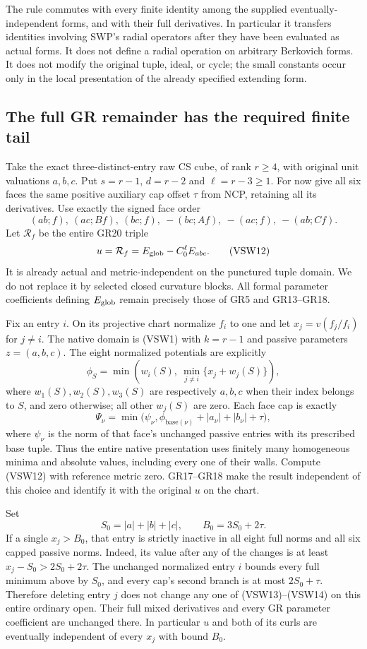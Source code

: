 The rule commutes with every finite identity among the supplied
eventually-independent forms, and with their full derivatives.
In particular it transfers identities involving SWP's radial
operators after they have been evaluated as actual forms.
It does not define a radial operation on arbitrary Berkovich
forms.  It does not modify the original tuple, ideal, or cycle;
the small constants occur only in the local presentation of the
already specified extending form.

\subsection{The full GR remainder has the required finite tail}

Take the exact three-distinct-entry raw CS cube, of rank $r\ge4$,
with original unit valuations $a,b,c$.  Put $s=r-1$,
$d=r-2$ and $\ell=r-3\ge1$.  For now give all six faces the
same positive auxiliary cap offset $\tau$ from NCP, retaining
all its derivatives.  Use exactly the signed face order
\[
 (ab;f),\ (ac;Bf),\ (bc;f),\ -(bc;Af),\ -(ac;f),\ -(ab;Cf).
 \tag{VSW11}
\]
Let $\mathcal R_f$ be the entire GR20 triple
\[
             u=\mathcal R_f=E_{\rm glob}-C_0^\ell E_{abc}.
 \tag{VSW12}
\]
It is already actual and metric-independent on the punctured
tuple domain.  We do not replace it by selected closed curvature
blocks.  All formal parameter coefficients defining $E_{\rm glob}$
remain precisely those of GR5 and GR13--GR18.

Fix an entry $i$.  On its projective chart normalize $f_i$ to
one and let $x_j=v(f_j/f_i)$ for $j\ne i$.  The native domain
is (VSW1) with $k=r-1$ and passive parameters $z=(a,b,c)$.
The eight normalized potentials are explicitly
\[
 \phi_S=\min\left(w_i(S),\ \min_{j\ne i}
                      \{x_j+w_j(S)\}\right),
 \tag{VSW13}
\]
where $w_1(S),w_2(S),w_3(S)$ are respectively $a,b,c$ when
their index belongs to $S$, and zero otherwise; all other
$w_j(S)$ are zero.  Each face cap is exactly
\[
 \Psi_\nu=\min\bigl(\psi_\nu,
       \phi_{\mathrm{base}(\nu)}+|a_\nu|+|b_\nu|+\tau\bigr),
 \tag{VSW14}
\]
where $\psi_\nu$ is the norm of that face's unchanged passive
entries with its prescribed base tuple.  Thus the entire native
presentation uses finitely many homogeneous minima and absolute
values, including every one of their walls.  Compute (VSW12)
with reference metric zero.  GR17--GR18 make the result independent
of this choice and identify it with the original $u$ on the chart.

Set
\[
       S_0=|a|+|b|+|c|,\qquad B_0=3S_0+2\tau.
 \tag{VSW15}
\]
If a single $x_j>B_0$, that entry is strictly inactive in all
eight full norms and all six capped passive norms.  Indeed, its
value after any of the changes is at least $x_j-S_0>2S_0+2\tau$.
The unchanged normalized entry $i$ bounds every full minimum
above by $S_0$, and every cap's second branch is at most
$2S_0+\tau$.  Therefore deleting entry $j$ does not change
any one of (VSW13)--(VSW14) on this entire ordinary open.
Their full mixed derivatives and every GR parameter coefficient
are unchanged there.  In particular $u$ and both of its curls
are eventually independent of every $x_j$ with bound $B_0$.

